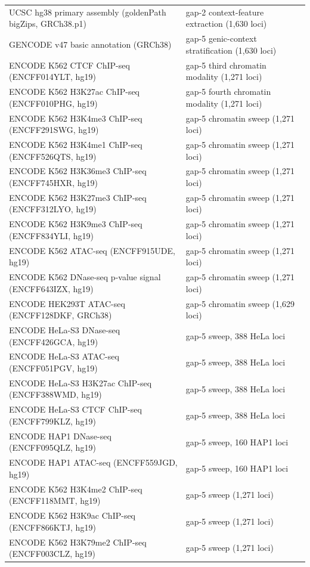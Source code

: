 \begin{longtable}{@{}p{}p{}@{}}
UCSC hg38 primary assembly (goldenPath bigZips, GRCh38.p1) & gap-2 context-feature extraction (1,630 loci) \\
GENCODE v47 basic annotation (GRCh38) & gap-5 genic-context stratification (1,630 loci) \\
ENCODE K562 CTCF ChIP-seq (ENCFF014YLT, hg19) & gap-5 third chromatin modality (1,271 loci) \\
ENCODE K562 H3K27ac ChIP-seq (ENCFF010PHG, hg19) & gap-5 fourth chromatin modality (1,271 loci) \\
ENCODE K562 H3K4me3 ChIP-seq (ENCFF291SWG, hg19) & gap-5 chromatin sweep (1,271 loci) \\
ENCODE K562 H3K4me1 ChIP-seq (ENCFF526QTS, hg19) & gap-5 chromatin sweep (1,271 loci) \\
ENCODE K562 H3K36me3 ChIP-seq (ENCFF745HXR, hg19) & gap-5 chromatin sweep (1,271 loci) \\
ENCODE K562 H3K27me3 ChIP-seq (ENCFF312LYO, hg19) & gap-5 chromatin sweep (1,271 loci) \\
ENCODE K562 H3K9me3 ChIP-seq (ENCFF834YLI, hg19) & gap-5 chromatin sweep (1,271 loci) \\
ENCODE K562 ATAC-seq (ENCFF915UDE, hg19) & gap-5 chromatin sweep (1,271 loci) \\
ENCODE K562 DNase-seq p-value signal (ENCFF643IZX, hg19) & gap-5 chromatin sweep (1,271 loci) \\
ENCODE HEK293T ATAC-seq (ENCFF128DKF, GRCh38) & gap-5 chromatin sweep (1,629 loci) \\
ENCODE HeLa-S3 DNase-seq (ENCFF426GCA, hg19) & gap-5 sweep, 388 HeLa loci \\
ENCODE HeLa-S3 ATAC-seq (ENCFF051PGV, hg19) & gap-5 sweep, 388 HeLa loci \\
ENCODE HeLa-S3 H3K27ac ChIP-seq (ENCFF388WMD, hg19) & gap-5 sweep, 388 HeLa loci \\
ENCODE HeLa-S3 CTCF ChIP-seq (ENCFF799KLZ, hg19) & gap-5 sweep, 388 HeLa loci \\
ENCODE HAP1 DNase-seq (ENCFF095QLZ, hg19) & gap-5 sweep, 160 HAP1 loci \\
ENCODE HAP1 ATAC-seq (ENCFF559JGD, hg19) & gap-5 sweep, 160 HAP1 loci \\
ENCODE K562 H3K4me2 ChIP-seq (ENCFF118MMT, hg19) & gap-5 sweep (1,271 loci) \\
ENCODE K562 H3K9ac ChIP-seq (ENCFF866KTJ, hg19) & gap-5 sweep (1,271 loci) \\
ENCODE K562 H3K79me2 ChIP-seq (ENCFF003CLZ, hg19) & gap-5 sweep (1,271 loci) \\

\end{longtable}
